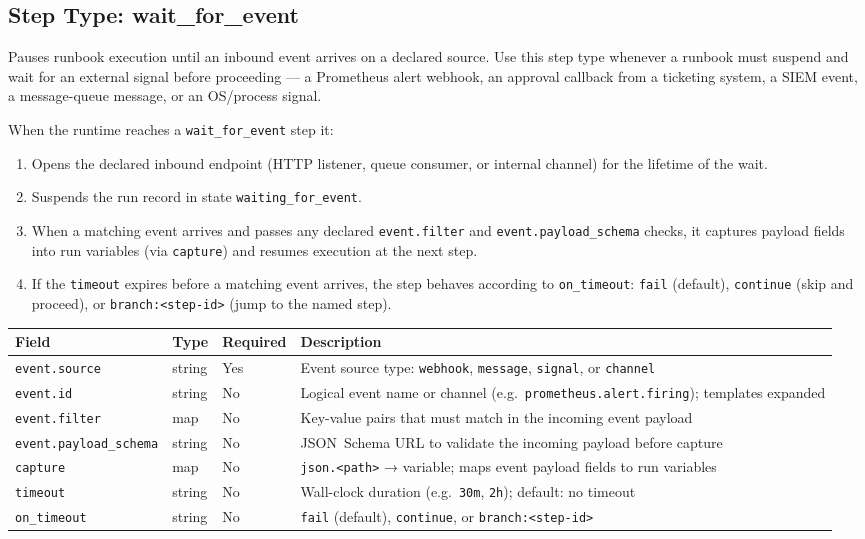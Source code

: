 \subsection{Step Type: wait\_for\_event}
\label{subsec:step-wait-for-event}

Pauses runbook execution until an inbound event arrives on a declared source.
Use this step type whenever a runbook must suspend and wait for an external
signal before proceeding — a Prometheus alert webhook, an approval callback
from a ticketing system, a SIEM event, a message-queue message, or an
OS/process signal.

When the runtime reaches a \texttt{wait\_for\_event} step it:
\begin{enumerate}
  \item Opens the declared inbound endpoint (HTTP listener, queue consumer, or
        internal channel) for the lifetime of the wait.
  \item Suspends the run record in state \texttt{waiting\_for\_event}.
  \item When a matching event arrives and passes any declared \texttt{event.filter}
        and \texttt{event.payload\_schema} checks, it captures payload fields into
        run variables (via \texttt{capture}) and resumes execution at the next step.
  \item If the \texttt{timeout} expires before a matching event arrives, the step
        behaves according to \texttt{on\_timeout}: \texttt{fail} (default),
        \texttt{continue} (skip and proceed), or
        \texttt{branch:<step-id>} (jump to the named step).
\end{enumerate}

\begin{center}
\begin{tabular}{lllp{5cm}}
\hline
\textbf{Field} & \textbf{Type} & \textbf{Required} & \textbf{Description} \\
\hline
\texttt{event.source}         & string & Yes & Event source type: \texttt{webhook}, \texttt{message}, \texttt{signal}, or \texttt{channel} \\
\texttt{event.id}             & string & No  & Logical event name or channel (e.g.\ \texttt{prometheus.alert.firing}); templates expanded \\
\texttt{event.filter}         & map    & No  & Key-value pairs that must match in the incoming event payload \\
\texttt{event.payload\_schema} & string & No  & JSON~Schema URL to validate the incoming payload before capture \\
\texttt{capture}              & map    & No  & \texttt{json.<path>} → variable; maps event payload fields to run variables \\
\texttt{timeout}              & string & No  & Wall-clock duration (e.g.\ \texttt{30m}, \texttt{2h}); default: no timeout \\
\texttt{on\_timeout}          & string & No  & \texttt{fail} (default), \texttt{continue}, or \texttt{branch:<step-id>} \\
\hline
\end{tabular}
\end{center}

